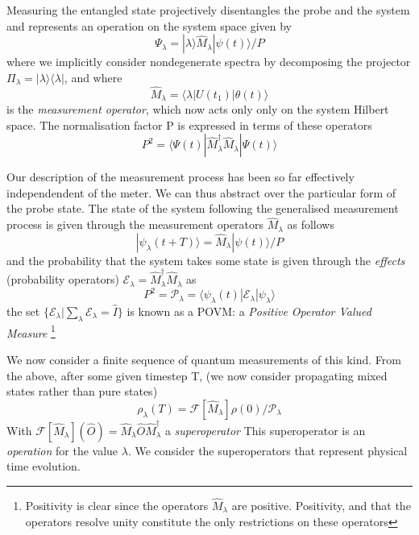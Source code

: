 Measuring the entangled state projectively disentangles the probe and the system and represents an operation on the system space given by 
\begin{equation}
\Psi_\lambda = | \lambda \rangle \hat{M}_\lambda | \psi(t) \rangle / P
\end{equation}
 where we implicitly consider nondegenerate spectra by decomposing the projector $\Pi_\lambda = |\lambda \rangle \langle \lambda |$, and where 
 \begin{equation}
     \hat{M}_\lambda = \langle \lambda | U(t_1) | \theta(t) \rangle 
 \end{equation}
 is the \emph{measurement operator}, which now acts only only on the system Hilbert space. The normalisation factor P is expressed in terms of these operators
 \begin{equation}
     P^2 = \langle \Psi (t) | \hat{M}_\lambda^\dagger \hat{M}_\lambda | \Psi (t) \rangle
 \end{equation}

 Our description of the measurement process has been so far effectively independendent of the meter. We can thus abstract over the particular form of the probe state. The state of the system following the generalised measurement process is given through the measurement operators $\hat{M}_\lambda$ as follows
 \begin{equation}
 | \psi_\lambda (t + T) \rangle = \hat{M}_\lambda | \psi(t) \rangle /P
 \end{equation}
 and the probability that the system takes some state is given through the \emph{effects} (probability operators) $ \mathscr{E}_\lambda = \hat{M}_\lambda^\dagger \hat{M}_\lambda $ as 
 \begin{equation}
     P^2 = \mathscr{P}_\lambda = \langle \psi_\lambda (t) | \mathscr{E}_\lambda | \psi_\lambda \rangle
 \end{equation}
 the set $\{\mathscr{E}_\lambda | \sum_\lambda \mathscr{E}_\lambda = \hat{I} \} $ is known as a POVM: a \emph{Positive Operator Valued Measure} \footnote{Positivity is clear since the operators $\hat{M}_\lambda$ are positive. Positivity, and that the operators resolve unity constitute the only restrictions on these operators}

 We now consider a finite sequence of quantum measurements of this kind. From the above, after some given timestep T, (we now consider propagating mixed states rather than pure states)
 \begin{equation}
     \rho_\lambda (T) = \mathscr{F}[\hat{M}_\lambda] \rho(0) / \mathscr{P}_\lambda 
 \end{equation}
 With $\mathscr{F}[\hat{M}_\lambda] ( \hat{O} ) =  \hat{M}_\lambda \hat{O} \hat{M}_\lambda ^ \dagger$ a \emph{superoperator}
 This superoperator is an \emph{operation} for the value $\lambda$. We consider the superoperators that represent physical time evolution. 
